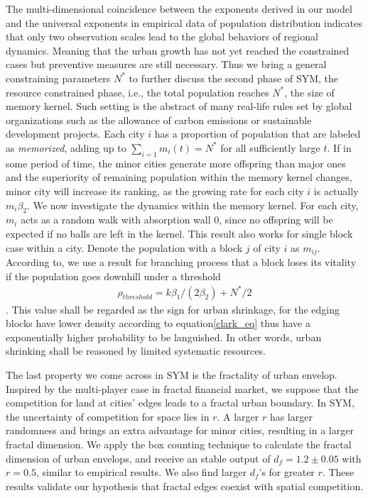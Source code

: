 \documentclass[reprint,unsortedaddress,amsmath,amssymb,aps,prl,fixfloat,showkeys]{revtex4-2}
\begin{document}
The multi-dimensional coincidence between the exponents derived in our model and the universal exponents in empirical data of population distribution indicates that only two observation scales lead to the global behaviors of regional dynamics. Meaning that the urban growth has not yet reached the constrained cases but preventive measures are still necessary. Thus we bring a general constraining parameters $N^*$ to further discuss the second phase of SYM, the resource constrained phase, i.e., the total population reaches $N^*$, the size of memory kernel. Such setting is the abstract of many real-life rules set by global organizations such as the allowance of carbon emissions or sustainable development projects. Each city $i$ has a proportion of population that are labeled as \emph{memorized}, adding up to $\sum_{i=1} m_i(t) = N^*$ for all sufficiently large $t$. If in some period of time, the minor cities generate more offspring than major ones and the superiority of remaining population within the memory kernel changes, minor city will increase its ranking, as the growing rate for each city $i$ is actually $m_i\beta_2$. We now investigate the dynamics within the memory kernel. For each city, $m_i$ acts as a random walk with absorption wall $0$, since no offspring will be expected if no balls are left in the kernel. This result also works for single block case within a city. Denote the population with a block $j$ of city $i$ as $m_{ij}$. According to\@\cite{durrett1999essentials}, we use a result for branching process that a block loses its vitality if the population goes downhill under a threshold \begin{align}\rho_{threshold} = k\beta_1/(2\beta_2)+N^*/2\end{align}. This value shall be regarded as the sign for urban shrinkage, for the edging blocks have lower density according to equation\@\ref{clark_eq} thus have a exponentially higher probability to be languished. In other words, urban shrinking shall be reasoned by limited systematic resources.

The last property we come across in SYM is the fractality of urban envelop. Inspired by the multi-player case in fractal financial market, we suppose that the competition for land at cities' edges leads to a fractal urban boundary. In SYM, the uncertainty of competition for space lies in $r$. A larger $r$ has larger randomness and brings an extra advantage for minor cities, resulting in a larger fractal dimension. We apply the box counting technique to calculate the fractal dimension of urban envelops, and receive an stable output of $d_f = 1.2\pm 0.05$ with $r = 0.5$, similar to empirical results\cite{batty1992form}. We also find larger $d_f$'s for greater $r$. These results validate our hypothesis that fractal edges coexist with spatial competition. 
\end{document}
